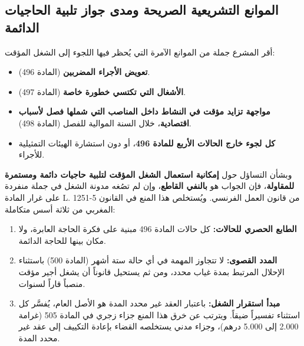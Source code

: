 \subsection{الموانع التشريعية الصريحة ومدى جواز تلبية الحاجيات الدائمة}
أقر المشرع جملة من الموانع الآمرة التي يُحظر فيها اللجوء إلى الشغل المؤقت:
\begin{tcolorbox}[colback=red!5, colframe=accentcolor, arc=4pt,
    title={\textbf{حالات يُمنع فيها اللجوء إلى الشغل المؤقت}}]
\begin{itemize}[leftmargin=*, itemsep=4pt]
    \item \textbf{تعويض الأجراء المضربين} (المادة \textenglish{496}).
    \item \textbf{الأشغال التي تكتسي خطورة خاصة} (المادة \textenglish{497}).
    \item \textbf{مواجهة تزايد مؤقت في النشاط داخل المناصب التي شملها فصل لأسباب اقتصادية}، خلال السنة الموالية للفصل (المادة \textenglish{498}).
    \item \textbf{كل لجوء خارج الحالات الأربع للمادة \textenglish{496}}، أو دون استشارة الهيئات التمثيلية للأجراء.
\end{itemize}
\end{tcolorbox}

وبشأن التساؤل حول \textbf{إمكانية استعمال الشغل المؤقت لتلبية حاجيات دائمة ومستمرة للمقاولة}، فإن الجواب هو \textbf{بالنفي القاطع}، وإن لم تصُغه مدونة الشغل في جملة منفردة على غرار المادة \textfrench{L. 1251-5} من قانون العمل الفرنسي. ويُستخلص هذا المنع في القانون المغربي من ثلاثة أسس متكاملة:
\begin{enumerate}[leftmargin=*, itemsep=5pt]
    \item \textbf{الطابع الحصري للحالات:} كل حالات المادة \textenglish{496} مبنية على فكرة الحاجة العابرة، ولا مكان بينها للحاجة الدائمة.
    \item \textbf{المدد القصوى:} لا تتجاوز المهمة في أي حالة ستة أشهر (المادة \textenglish{500}) باستثناء الإحلال المرتبط بمدة غياب محدد، ومن ثم يستحيل قانوناً أن يشغل أجير مؤقت منصباً قاراً لسنوات.
    \item \textbf{مبدأ استقرار الشغل:} باعتبار العقد غير محدد المدة هو الأصل العام، يُفسَّر كل استثناء تفسيراً ضيقاً. ويترتب عن خرق هذا المنع جزاء زجري في المادة \textenglish{505} (غرامة \textenglish{2.000} إلى \textenglish{5.000} درهم)، وجزاء مدني يستخلصه القضاء بإعادة التكييف إلى عقد غير محدد المدة.
\end{enumerate}

